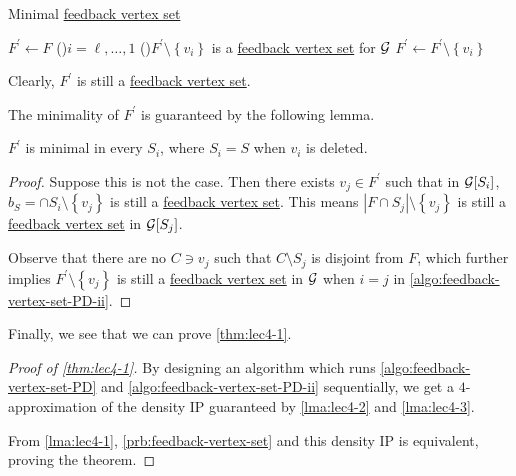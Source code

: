 \begin{algorithm}[H]\label{algo:feedback-vertex-set-PD-ii}
	\DontPrintSemicolon
	\caption{Minimal \hyperref[prb:feedback-vertex-set]{feedback vertex set}}
	\BlankLine
	\(F^\prime \gets F\)\;
	\For(){\(i = \ell , \ldots  , 1\)}{
		\If(){\(F^\prime \setminus \left\{ v_i \right\}\) is a \hyperref[prb:feedback-vertex-set]{feedback vertex set} for \(\mathcal{\MakeUppercase{g}} \) }{
			\(F^\prime \gets F^\prime \setminus \left\{ v_i \right\} \)\;
		}
	}
	\;
\end{algorithm}
\begin{note}
	Clearly, \(F^\prime \) is still a \hyperref[prb:feedback-vertex-set]{feedback vertex set}.
\end{note}

The minimality of \(F^\prime \) is guaranteed by the following lemma.

\begin{lemma}\label{lma:lec4-3}
	\(F^\prime \) is minimal in every \(S_i\), where \(S_i = S\) when \(v_i\) is deleted.
\end{lemma}
\begin{proof}
	Suppose this is not the case. Then there exists \(v_j\in F^\prime \) such that in \(\mathcal{\MakeUppercase{g}} [S_i]\), \(b_S= \cap S_i\setminus \left\{ v_{j}  \right\}\) is still a \hyperref[prb:feedback-vertex-set]{feedback vertex set}. This means \(\left\vert F \cap S_j \right\vert \setminus \left\{ v_{j}  \right\}  \) is still a \hyperref[prb:feedback-vertex-set]{feedback vertex set} in \(\mathcal{\MakeUppercase{g}} [S_j]\).

	Observe that there are no \(C\ni v_j\) such that \(C\setminus S_j\) is disjoint from \(F\), which further implies \(F^\prime \setminus \left\{ v_j \right\} \) is still a \hyperref[prb:feedback-vertex-set]{feedback vertex set} in \(\mathcal{\MakeUppercase{g}} \) when \(i = j\) in \autoref{algo:feedback-vertex-set-PD-ii}.
\end{proof}

Finally, we see that we can prove \autoref{thm:lec4-1}.

\begin{proof}[Proof of \autoref{thm:lec4-1}]
	By designing an algorithm which runs \autoref{algo:feedback-vertex-set-PD} and \autoref{algo:feedback-vertex-set-PD-ii} sequentially, we get a \(4\)-approximation of the density IP guaranteed by \autoref{lma:lec4-2} and \autoref{lma:lec4-3}.

	From \autoref{lma:lec4-1}, \autoref{prb:feedback-vertex-set} and this density IP is equivalent, proving the theorem.
\end{proof}